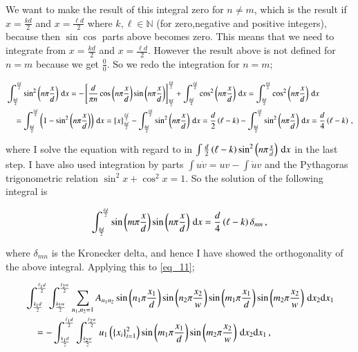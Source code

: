 \documentclass[11pt,english,a4paper]{article}
\begin{document}
\begin{flushleft}
We want to make the result of this integral zero for $n\neq m$, which is the result if $x=\frac{k d}{2}$ and $x=\frac{\ell d}{2}$ where $k,\ell\in\mathbb{N}$ (for zero,negative and positive integers), because then $\sin\cos$ parts above becomes zero. This means that we need to integrate from $x=\frac{k d}{2}$ and $x=\frac{\ell d}{2}$. However the result above is not defined for $n=m$ because we get $\frac{0}{0}$. So we redo the integration for $n=m$;

\begin{align*}
&\int_{\frac{k d}{2}}^{\frac{\ell d}{2}} \sin^2\left({n\pi\frac{x}{d}}\right)\,\mathrm{d}x 
= -\left[{ \frac{d}{\pi n}\cos\left({n\pi\frac{x}{d}}\right)\sin\left({n\pi\frac{x}{d}}\right)}\right]_{\frac{k d}{2}}^{\frac{\ell d}{2}} + \int_{\frac{k d}{2}}^{\frac{\ell d}{2}} \cos^2\left({n\pi\frac{x}{d}}\right)\,\mathrm{d}x
= \int_{\frac{k d}{2}}^{\frac{\ell d}{2}}  \cos^2\left({n\pi\frac{x}{d}}\right)\,\mathrm{d}x
\\ 
&\quad = \int_{\frac{k d}{2}}^{\frac{\ell d}{2}}  \left({1-\sin^2\left({n\pi\frac{x}{d}}\right)}\right)\,\mathrm{d}x 
= \left[{x}\right]_{\frac{k d}{2}}^{\frac{\ell d}{2}} - \int_{\frac{k d}{2}}^{\frac{\ell d}{2}}  \sin^2\left({n\pi\frac{x}{d}}\right)\,\mathrm{d}x 
= \frac{d}{2}\left({\ell-k}\right) - \int_{\frac{k d}{2}}^{\frac{\ell d}{2}}  \sin^2\left({n\pi\frac{x}{d}}\right)\,\mathrm{d}x 
= \frac{d}{4}\left({\ell-k}\right) \,,
\end{align*}

where I solve the equation with regard to in $\int\frac{d}{2}\left({\ell-k}\right) \sin^2\left({n\pi\frac{x}{d}}\right)\,\mathrm{d}x$ in the last step. I have also used integration by parts $\int u\dot{v} = uv - \int \dot{u}v$ and the Pythagoras trigonometric relation $\sin^2 x+ \cos^2 x = 1$. So the solution of the following integral is

\begin{align*}
\int_{\frac{k d}{2}}^{\frac{\ell d}{2}} \sin\left({m\pi\frac{x}{d}}\right)\sin\left({n\pi\frac{x}{d}}\right)\,\mathrm{d}x = \frac{d}{4}\left({\ell-k}\right)\delta_{mn}\,,
\end{align*}

where $\delta_{mn}$ is the Kronecker delta, and hence I have showed the orthogonality of the above integral. Applying this to \eqref{eq_11};

\begin{align*}
&\int_{\frac{k_1 d}{2}}^{\frac{\ell_1 d}{2}}\int_{\frac{k_2 w}{2}}^{\frac{\ell_2 w}{2}}  \sum_{n_1,n_2=1}A_{n_1 n_2} \sin\left({n_1\pi \frac{x_1}{d}}\right) \sin\left({n_2\pi \frac{x_2}{w}}\right)\sin\left({m_1\pi\frac{x_1}{d}}\right)\sin\left({m_2\pi\frac{x_2}{w}}\right)\,\mathrm{d}x_2\mathrm{d}x_1 
\\
& \quad = - \int_{\frac{k_1 d}{2}}^{\frac{\ell_1 d}{2}}\int_{\frac{k_2 w}{2}}^{\frac{\ell_2 w}{2}} u_1\left({\left\lbrace{x_i}\right\rbrace_{i=1}^2}\right)\sin\left({m_1\pi\frac{x_1}{d}}\right)\sin\left({m_2\pi\frac{x_2}{w}}\right)\,\mathrm{d}x_2\mathrm{d}x_1\,,
\end{align*}


\end{flushleft}
\end{document}
